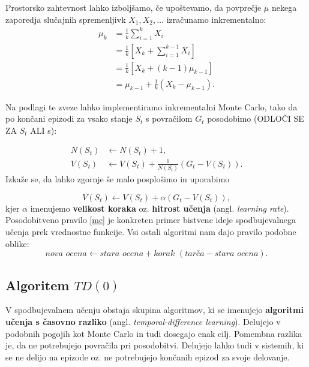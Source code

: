 \documentclass[12pt,a4paper]{amsart}
\theoremstyle{definition} %
\theoremstyle{plain} %
\begin{document}
Prostorsko zahtevnost lahko izboljšamo, če upoštevamo, da povprečje $\mu$ nekega zaporedja slučajnih 
spremenljivk $X_1, X_2, \dots$ izračunamo inkrementalno:
\begin{align*}
    \mu_k &= \frac{1}{k} \sum_{i = 1}^k X_i \\
        &= \frac{1}{k} \left[X_k + \sum_{i = 1}^{k-1} X_i \right] \\
        &= \frac{1}{k} \left[X_k + (k-1) \mu_{k-1} \right] \\
        &= \mu_{k-1} + \frac{1}{k} \left(X_k - \mu_{k-1} \right).
\end{align*}

Na podlagi te zveze lahko implementiramo inkrementalni Monte Carlo, tako da po končani epizodi 
za vsako stanje $S_t$ s povračilom $G_t$ posodobimo (ODLOČI SE ZA $S_t$ ALI s): 

\begin{align*}
    N(S_t) &\leftarrow N(S_t) + 1, \\
    V(S_t) &\leftarrow V(S_t) + \frac{1}{N(S_t)} (G_t - V(S_t)).
\end{align*}
Izkaže se, da lahko zgornje še malo posplošimo in uporabimo

\begin{equation}\label{mc}
    V(S_t) \leftarrow V(S_t) + \alpha (G_t - V(S_t)),
\end{equation}
kjer $\alpha$ imenujemo \textbf{velikost koraka} oz. \textbf{hitrost učenja} (angl. 
\textit{learning rate}). Posodobitveno pravilo \eqref{mc} je konkreten primer bistvene ideje 
spodbujevalnega učenja prek vrednostne funkcije. Vsi ostali algoritmi nam dajo pravilo podobne 
oblike: 
\begin{equation}\label{osnova}
    \textit{nova ocena} \leftarrow \textit{stara ocena} + \textit{korak } 
    (\textit{tarča} - \textit{stara ocena}).
\end{equation}

\subsection{Algoritem $TD(0)$}
V spodbujevalnem učenju obstaja skupina algoritmov, ki se imenujejo \textbf{algoritmi učenja s 
časovno razliko} (angl. \textit{temporal-difference learning}). Delujejo v podobnih pogojih kot 
Monte Carlo in tudi dosegajo enak cilj. Pomembna razlika je, da ne potrebujejo povračila pri 
posodobitvi. Delujejo lahko tudi v sistemih, ki se ne delijo na epizode oz. ne potrebujejo 
končanih epizod za svoje delovanje.
\end{document}
